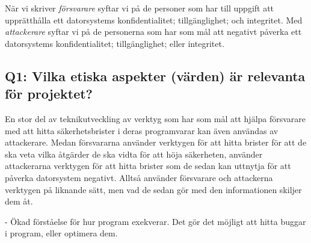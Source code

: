 

När vi skriver \emph{försvarare} syftar vi på de personer som har till uppgift att upprätthålla  ett datorsystems konfidentialitet; tillgänglighet; och integritet.
Med \emph{attackerare} syftar vi på de personerna som har som mål att negativt påverka ett datorsystems konfidentialitet; tillgänglighet; eller integritet.

\subsection{Q1: Vilka etiska aspekter (värden) är relevanta för projektet?}


En stor del av teknikutveckling av verktyg som har som mål att hjälpa försvarare med att hitta säkerhetsbrister i deras programvarar kan även användas av attackerare.
Medan försvararna använder verktygen för att hitta brister för att de ska veta vilka åtgärder de ska vidta för att höja säkerheten, använder attackerarna verktygen för att hitta brister som de sedan kan uttnytja för att påverka datorsystem negativt.
Alltså använder försvarare och attackerna verktygen på liknande sätt, men vad de sedan gör med den informationen skiljer dem åt.

- Ökad förståelse för hur program exekverar. Det gör det möjligt att hitta buggar i program, eller optimera dem.

